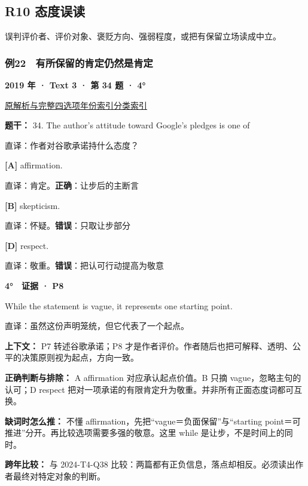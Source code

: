 \documentclass[11pt,a4paper]{article}
\begin{document}
\subsection{R10 态度误读}
误判评价者、评价对象、褒贬方向、强弱程度，或把有保留立场读成中立。

\subsubsection{例22　有所保留的肯定仍然是肯定}\label{case-2019-T3-Q34}
\noindent\textbf{2019 年 · Text 3 · 第 34 题 · 4°}\par\noindent \href{https://zj139.github.io/math-notes/english/e628c563c6583f6521f56489/\#q34}{原解析与完整四选项}\quad \hyperref[idx-2019-T3-Q34]{年份索引}\quad \hyperref[class-R10]{分类索引}\par\smallskip
\noindent\textbf{题干：} 34. The author’s attitude toward Google’s pledges is one of\par\smallskip
直译：作者对谷歌承诺持什么态度？

\noindent\textbf{[A]} affirmation.\par\nopagebreak
\noindent 直译：肯定。\quad\textbf{正确}：让步后的主断言\par\smallskip
{}\noindent\textbf{[B]} skepticism.\par\nopagebreak
\noindent 直译：怀疑。\quad\textbf{错误}：只取让步部分\par\smallskip
{}\noindent\textbf{[D]} respect.\par\nopagebreak
\noindent 直译：敬重。\quad\textbf{错误}：把认可行动提高为敬意\par\smallskip
\begin{evidence}\textbf{4°　证据 · P8}\par While the statement is vague, it represents one starting point.\par 直译：虽然这份声明笼统，但它代表了一个起点。\end{evidence}
\noindent\textbf{上下文：} P7 转述谷歌承诺；P8 才是作者评价。作者随后也把可解释、透明、公平的决策原则视为起点，方向一致。\par\smallskip
\noindent\textbf{正确判断与排除：} A affirmation 对应承认起点价值。B 只摘 vague，忽略主句的认可；D respect 把对一项承诺的有限肯定升为敬重。并非所有正面态度词都可互换。\par\smallskip
\noindent\textbf{缺词时怎么推：} 不懂 affirmation，先把“vague＝负面保留”与“starting point＝可推进”分开。再比较选项需要多强的敬意。这里 while 是让步，不是时间上的同时。\par\smallskip
\noindent\textbf{跨年比较：} 与 2024-T4-Q38 比较：两篇都有正负信息，落点却相反。必须读出作者最终对特定对象的判断。\par\smallskip
\clearpage
\end{document}
